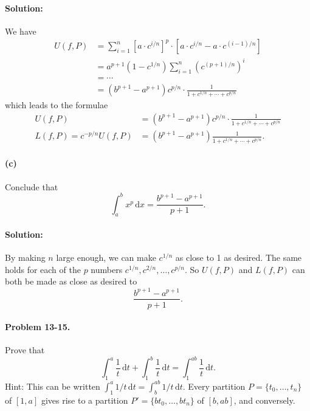 \documentclass{article}
\begin{document}
\paragraph{Solution:} We have \begin{align*}
  U(f, P) &= \sum_{i = 1}^n[a \cdot c^{i/n}]^p \cdot [a \cdot c^{i/n} - a \cdot
    c^{(i - 1)/n}] \\
    &= a^{p + 1}(1 - c^{1/n})\sum_{i = 1}^n(c^{(p + 1)/n})^i \\
    &= \cdots \\
    &= (b^{p + 1} - a^{p + 1})c^{p/n} \cdot \frac{1}{1 + c^{1/n} + \cdots +
      c^{p/n}}
\end{align*} which leads to the formulae \begin{align*}
  U(f, P) &= (b^{p + 1} - a^{p + 1})c^{p/n} \cdot \frac{1}{1 + c^{1/n} + \cdots
    + c^{p/n}} \\
  L(f, P) = c^{-p/n}U(f, P) &= (b^{p + 1} - a^{p + 1})\frac{1}{1 + c^{1/n} +
    \cdots + c^{p/n}}.
\end{align*}

\paragraph{(c)} Conclude that \begin{equation*}
  \int_a^b x^p \,\mathrm{d}x = \frac{b^{p + 1} - a^{p + 1}}{p + 1}.
\end{equation*}

\paragraph{Solution:} By making $n$ large enough, we can make $c^{1/n}$ as
close to 1 as desired. The same holds for each of the $p$ numbers $c^{1/n},
c^{2/n}, \ldots, c^{p/n}$. So $U(f, P)$ and $L(f, P)$ can both be made as close
as desired to \begin{equation*}
  \frac{b^{p + 1} - a^{p + 1}}{p + 1}.
\end{equation*}

\paragraph{Problem 13-15.} Prove that \begin{equation*}
  \int_1^a \frac{1}{t} \,\mathrm{d}t + \int_1^b \frac{1}{t} \,\mathrm{d}t =
    \int_1^{ab} \frac{1}{t} \,\mathrm{d}t.
\end{equation*} Hint: This can be written $\int_1^a 1/t \,\mathrm{d}t =
\int_b^{ab} 1/t \,\mathrm{d}t$. Every partition $P = \{t_0, \ldots, t_n\}$ of
$[1, a]$ gives rise to a partition $P' = \{bt_0, \ldots, bt_n\}$ of $[b, ab]$,
and conversely.
\end{document}
